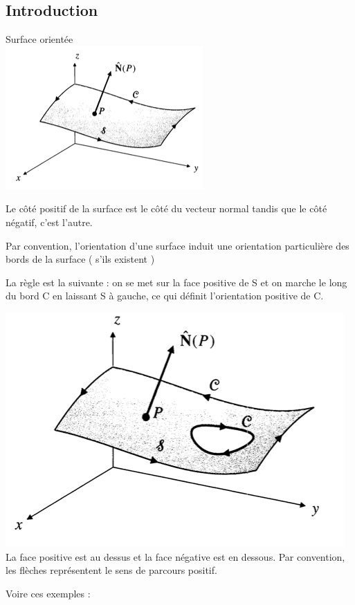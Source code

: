 \subsection{Introduction}
 Surface orientée\\
 \includegraphics[scale=0.6]{image5.png}

 Le côté positif de la surface est le côté du vecteur normal tandis que le côté négatif, c'est l'autre.

 Par convention, l'orientation d'une surface induit une orientation particulière des bords de la surface ( s'ils existent )

 La règle est la suivante : on se met sur la face positive de S et on marche le long du bord C en laissant S à gauche, ce qui définit l'orientation positive de C.

 \includegraphics[scale=0.7]{image6.png}
 La face positive est au dessus et la face négative est en dessous. Par convention, les flèches représentent le sens de parcours positif.

 Voire ces exemples :


